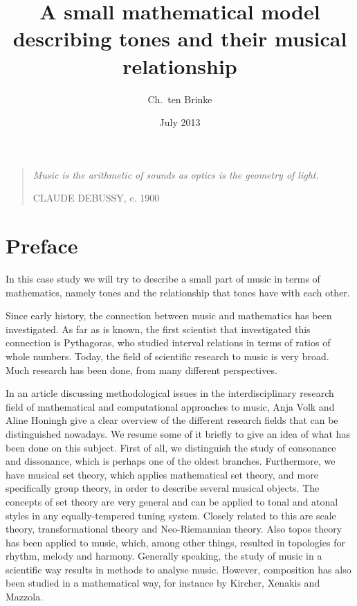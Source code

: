 \documentclass[a4paper]{book}
\title{A small mathematical model describing tones and their musical relationship}
\author{Ch.\ ten Brinke}
\date{July 2013}
\theoremstyle{definition}
\begin{document}
\maketitle

\vspace*{\fill}
\thispagestyle{empty} %
\begin{quotation}
    \em %
    \Large{Music is the arithmetic of sounds as optics is the geometry of light.}

    \medskip
    \raggedleft
    CLAUDE DEBUSSY, c. 1900
\end{quotation}
\vspace*{\fill}

\tableofcontents


\chapter*{Preface}
In this case study we will try to describe a small part of music in terms of mathematics, namely tones and the relationship that tones have with each other.

Since early history, the connection between music and mathematics has been investigated.
As far as is known, the first scientist that investigated this connection is Pythagoras, who studied interval relations in terms of ratios of whole numbers.
Today, the field of scientific research to music is very broad.
Much research has been done, from many different perspectives.

In an article discussing methodological issues in the interdisciplinary research field of mathematical and computational approaches to music, Anja Volk and Aline Honingh give a clear overview of the different research fields that can be distinguished nowadays.
\cite{VolkHoningh}
We resume some of it briefly to give an idea of what has been done on this subject.
First of all, we distinguish the study of consonance and dissonance, which is perhaps one of the oldest branches.
Furthermore, we have musical set theory, which applies mathematical set theory, and more specifically group theory, in order to describe several musical objects.
The concepts of set theory are very general and can be applied to tonal and atonal styles in any equally-tempered tuning system.
Closely related to this are scale theory, transformational theory and Neo-Riemannian theory.
Also topos theory has been applied to music, which, among other things, resulted in topologies for rhythm, melody and harmony.
Generally speaking, the study of music in a scientific way results in methods to analyse music.
However, composition has also been studied in a mathematical way, for instance by Kircher, Xenakis and Mazzola.
\end{document}

